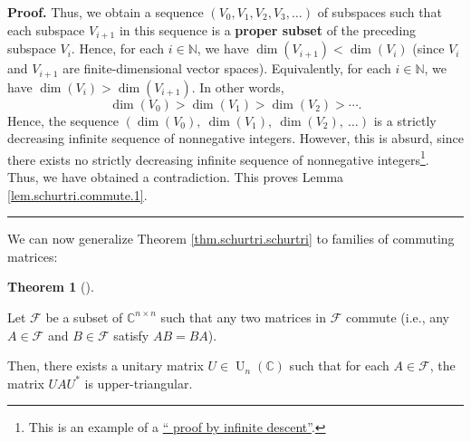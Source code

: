 \documentclass[numbers=enddot,12pt,final,onecolumn,notitlepage]{scrartcl}%
\numberwithin{exer}{subsection}
\theoremstyle{definition}
\newtheorem{theo}{Theorem}[subsection]
\newenvironment{theorem}[1][]
{\begin{theo}[#1]\begin{leftbar}}
{\end{leftbar}\end{theo}}
\newenvironment{proof}[1][Proof]{\noindent\textbf{#1.} }{\ \rule{0.5em}{0.5em}}
\begin{document}
\begin{proof}
Thus, we obtain a sequence $\left(  V_{0},V_{1},V_{2},V_{3},\ldots\right)  $
of subspaces such that each subspace $V_{i+1}$ in this sequence is a
\textbf{proper subset} of the preceding subspace $V_{i}$. Hence, for each
$i\in\mathbb{N}$, we have $\dim\left(  V_{i+1}\right)  <\dim\left(
V_{i}\right)  $ (since $V_{i}$ and $V_{i+1}$ are finite-dimensional vector
spaces). Equivalently, for each $i\in\mathbb{N}$, we have $\dim\left(
V_{i}\right)  >\dim\left(  V_{i+1}\right)  $. In other words,%
\[
\dim\left(  V_{0}\right)  >\dim\left(  V_{1}\right)  >\dim\left(
V_{2}\right)  >\cdots.
\]
Hence, the sequence $\left(  \dim\left(  V_{0}\right)  ,\ \dim\left(
V_{1}\right)  ,\ \dim\left(  V_{2}\right)  ,\ \ldots\right)  $ is a strictly
decreasing infinite sequence of nonnegative integers. However, this is absurd,
since there exists no strictly decreasing infinite sequence of nonnegative
integers\footnote{This is an example of a
\href{https://en.wikipedia.org/wiki/Proof_by_infinite_descent}{\textquotedblleft
proof by infinite descent\textquotedblright}.}. Thus, we have obtained a
contradiction. This proves Lemma \ref{lem.schurtri.commute.1}.
\end{proof}

We can now generalize Theorem \ref{thm.schurtri.schurtri} to families of
commuting matrices:

\begin{theorem}
\label{thm.schurtri.commute.schurtri}Let $\mathcal{F}$ be a subset of
$\mathbb{C}^{n\times n}$ such that any two matrices in $\mathcal{F}$ commute
(i.e., any $A\in\mathcal{F}$ and $B\in\mathcal{F}$ satisfy $AB=BA$).

Then, there exists a unitary matrix $U\in\operatorname*{U}\nolimits_{n}\left(
\mathbb{C}\right)  $ such that for each $A\in\mathcal{F}$, the matrix
$UAU^{\ast}$ is upper-triangular.
\end{theorem}
\end{document}
